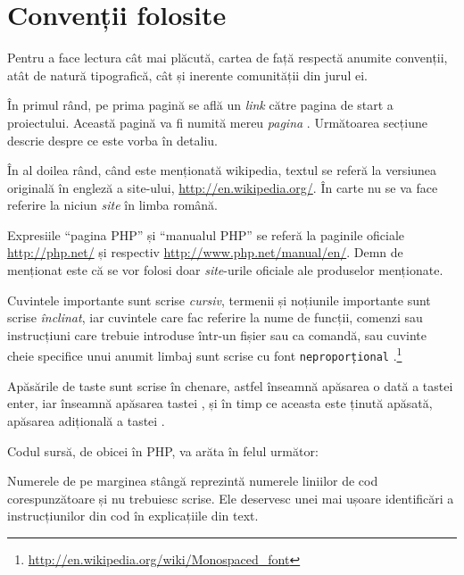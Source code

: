 \section*{Convenții folosite}
{}

Pentru a face lectura cât mai plăcută, cartea de față respectă anumite
convenții, atât de natură tipografică, cât și inerente comunității din jurul
ei.

În primul rând, pe prima pagină se află un \textit{link} către pagina de
start a proiectului. Această pagină va fi numită mereu \textit{pagina {\phpro}}.
Următoarea secțiune descrie despre ce este vorba în detaliu.

În al doilea rând, când este menționată wikipedia, textul se referă la
versiunea originală în engleză a site-ului, \url{http://en.wikipedia.org/}. În
carte nu se va face referire la niciun \textit{site} în limba română.

Expresiile ``pagina PHP'' și ``manualul PHP'' se referă la paginile oficiale
\url{http://php.net/} și respectiv \url{http://www.php.net/manual/en/}. Demn de
menționat este că se vor folosi doar \textit{site}-urile oficiale ale
produselor menționate.


Cuvintele importante sunt scrise \textit{cursiv}, termenii și noțiunile
importante sunt scrise \textsl{înclinat}, iar cuvintele care fac referire la
nume de funcții, comenzi sau instrucțiuni care trebuie introduse într-un fișier
sau ca comandă, sau cuvinte cheie specifice unui anumit limbaj sunt scrise cu
font
\texttt{neproporțional}%
.\footnote{\url{http://en.wikipedia.org/wiki/Monospaced_font}}

Apăsările de taste sunt scrise în chenare, astfel  înseamnă
apăsarea o dată a tastei enter, iar  înseamnă apăsarea tastei
, și în timp ce aceasta este ținută apăsată, apăsarea
adițională a tastei .

Codul sursă, de obicei în PHP, va arăta în felul următor:



Numerele de pe marginea stângă reprezintă numerele liniilor de cod
corespunzătoare și nu trebuiesc scrise. Ele deservesc unei mai ușoare
identificări a instrucțiunilor din cod în explicațiile din text.

